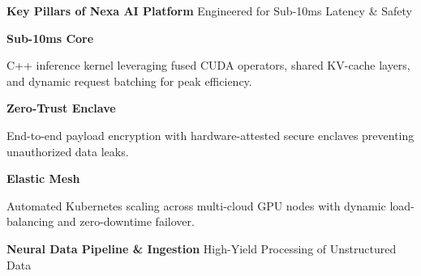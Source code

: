 \documentclass[20pt,landscape,a4paper]{foils}
\newcommand{\SlideHeader}[2]{%
  \begin{tcolorbox}[headerbox]
    {\Huge\bfseries #1} \hfill {\large\textcolor{SlateBorder}{#2}}
  \end{tcolorbox}
  \vspace{6pt}
}
\begin{document}
\SlideHeader{Key Pillars of Nexa AI Platform}{Engineered for Sub-10ms Latency \& Safety}

\noindent
\begin{minipage}[t]{0.31\textwidth}
  \begin{tcolorbox}[basebox]
    \centering
    \textcolor{TealAccent}{\Huge \faCogs} \par\vspace{6pt}
    {\large\bfseries Sub-10ms Core} \par\vspace{4pt}
    \small C++ inference kernel leveraging fused CUDA operators, shared KV-cache layers, and dynamic request batching for peak efficiency.
  \end{tcolorbox}
\end{minipage}%
\hfill
\begin{minipage}[t]{0.31\textwidth}
  \begin{tcolorbox}[basebox]
    \centering
    \textcolor{NavyPrimary}{\Huge \faLock} \par\vspace{6pt}
    {\large\bfseries Zero-Trust Enclave} \par\vspace{4pt}
    \small End-to-end payload encryption with hardware-attested secure enclaves preventing unauthorized data leaks.
  \end{tcolorbox}
\end{minipage}%
\hfill
\begin{minipage}[t]{0.31\textwidth}
  \begin{tcolorbox}[basebox]
    \centering
    \textcolor{AmberAccent}{\Huge \faLayerGroup} \par\vspace{6pt}
    {\large\bfseries Elastic Mesh} \par\vspace{4pt}
    \small Automated Kubernetes scaling across multi-cloud GPU nodes with dynamic load-balancing and zero-downtime failover.
  \end{tcolorbox}
\end{minipage}
\pagebreak

\SlideHeader{Neural Data Pipeline \& Ingestion}{High-Yield Processing of Unstructured Data}
\end{document}
